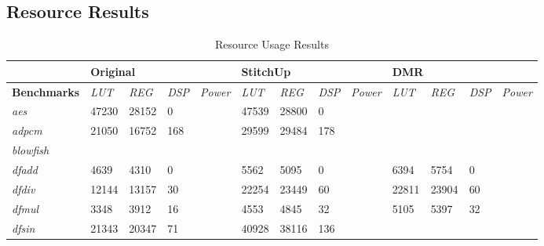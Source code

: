 \subsection{Resource Results}
\begin{table}[t]
\small
\singlespace
\centering
\caption{Resource Usage Results}
\label{tab:resources}
\tabcolsep=0.11cm
\begin{tabular}{@{}|l|l|l|l|l|l|l|l|l|l|l|l|l|@{}}
\toprule
                    & \multicolumn{4}{l|}{\textbf{Original}}                      & \multicolumn{4}{l|}{\textbf{StitchUp}}                      & \multicolumn{4}{l|}{\textbf{DMR}}                           \\ \midrule
\textbf{Benchmarks} & \textit{LUT} & \textit{REG} & \textit{DSP} & \textit{Power} & \textit{LUT} & \textit{REG} & \textit{DSP} & \textit{Power} & \textit{LUT} & \textit{REG} & \textit{DSP} & \textit{Power} \\ \midrule
\textit{aes}        & 47230        & 28152        & 0            &                & 47539        & 28800        & 0            &                &              &              &              &                \\ \midrule
\textit{adpcm}      & 21050        & 16752        & 168          &                & 29599        & 29484        & 178          &                &              &              &              &                \\ \midrule
\textit{blowfish}   &              &              &              &                &              &              &              &                &              &              &              &                \\ \midrule
\textit{dfadd}      & 4639         & 4310         & 0            &                & 5562         & 5095         & 0            &                & 6394         & 5754         & 0            &                \\ \midrule
\textit{dfdiv}      & 12144        & 13157        & 30           &                & 22254        & 23449        & 60           &                & 22811        & 23904        & 60           &                \\ \midrule
\textit{dfmul}      & 3348         & 3912         & 16           &                & 4553         & 4845         & 32           &                & 5105         & 5397         & 32           &                \\ \midrule
\textit{dfsin}      & 21343        & 20347        & 71           &                & 40928        & 38116        & 136          &                &              &              &              &                \\ \midrule

\end{tabular}
\end{table}
